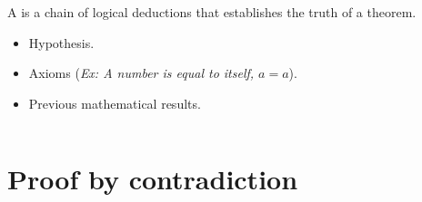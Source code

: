 \documentclass[11pt,a4paper,xcolor=dvipsnames, leqno]{beamer}
\begin{document}
\begin{frame}
A  is a chain of logical deductions that establishes the truth of a theorem.
\begin{itemize}
\item<2-> Hypothesis.
\item<2-> Axioms (\emph{Ex: A number is equal to itself, $a = a$}).
\item<2-> Previous mathematical results.
\end{itemize}
\begin{columns}
\begin{column}{0.5\textwidth}
\vspace*{-0.1cm}
\end{column}
\begin{column}{0.5\textwidth}
\end{column}
\end{columns}

\end{frame}

\section{Proof by contradiction}
\end{document}
